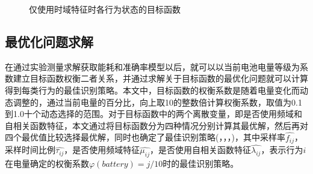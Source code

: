 \begin{figure}[!htb]
    \centering
    \caption{仅使用时域特征时各行为状态的目标函数}\label{object_function}
\end{figure}

\subsection{最优化问题求解}
\par 在通过实验测量求解获取能耗和准确率模型以后，就可以以当前电池电量等级为系数建立目标函数权衡二者关系，并通过求解关于目标函数的最优化问题就可以计算得到每类行为的最佳识别策略。本文中，目标函数的权衡系数是随着电量变化而动态调整的，通过当前电量的百分比，向上取10的整数倍计算权衡系数，取值为0.1到1.0十个动态选择的范围。对于目标函数中的两个离散变量，即是否使用频域和自相关函数特征，本文通过将目标函数分为四种情况分别计算其最优解，然后再对四个最优值比较选择最优解，同时也确定了最佳识别策略(，\bm{$\widehat{\tau}$}，\bm{$\widehat{\mu}$}，\bm{$\widehat{\lambda}$})，其中采样率$\widehat{f_{ij}}$，采样时间比例$\widehat{\tau_{ij}}$，是否使用频域特征$\widehat{\mu_{ij}}$，是否使用自相关函数特征$\widehat{\lambda_{ij}}$，表示行为$i$在电量确定的权衡系数$\varphi (battery) = j/10$时的最佳识别策略。


